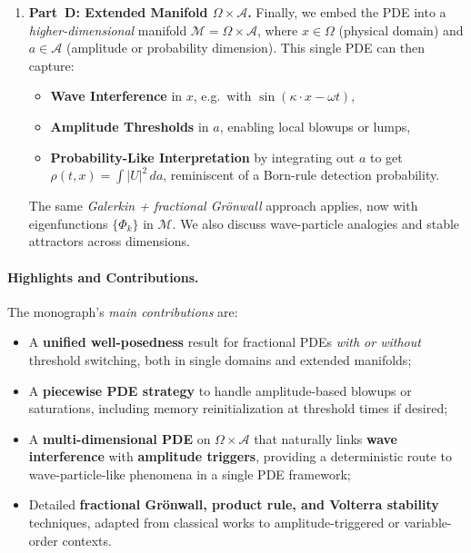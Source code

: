 \documentclass[12pt]{article}
\begin{document}
\begin{enumerate}
\item \textbf{Part~D: Extended Manifold \(\Omega\times \mathcal{A}\).}
  Finally, we embed the PDE into a \emph{higher-dimensional} manifold 
  $\mathcal{M}=\Omega\times\mathcal{A}$, where $x\in\Omega$ (physical domain) and 
  $a\in\mathcal{A}$ (amplitude or probability dimension). This single PDE can then 
  capture:
  \begin{itemize}
    \item \textbf{Wave Interference} in $x$, e.g.\ with $\sin(\kappa\cdot x-\omega t)$,
    \item \textbf{Amplitude Thresholds} in $a$, enabling local blowups or lumps,
    \item \textbf{Probability-Like Interpretation} by integrating out $a$ to get 
          $\rho(t,x)=\int|U|^2\,da$, reminiscent of a Born-rule detection probability.
  \end{itemize}
  The same \emph{Galerkin + fractional Grönwall} approach applies, now with 
  eigenfunctions $\{\Phi_k\}$ in $\mathcal{M}$. We also discuss wave-particle analogies 
  and stable attractors across dimensions.
\end{enumerate}

\paragraph{Highlights and Contributions.}
The monograph’s \emph{main contributions} are:
\begin{itemize}
    \item A \textbf{unified well-posedness} result for fractional PDEs \emph{with or 
          without} threshold switching, both in single domains and extended manifolds;
    \item A \textbf{piecewise PDE strategy} to handle amplitude-based blowups or saturations, 
          including memory reinitialization at threshold times if desired;
    \item A \textbf{multi-dimensional PDE} on $\Omega\times\mathcal{A}$ that naturally 
          links \textbf{wave interference} with \textbf{amplitude triggers}, providing a 
          deterministic route to wave-particle-like phenomena in a single PDE framework;
    \item Detailed \textbf{fractional Grönwall, product rule, and Volterra stability} 
          techniques, adapted from classical works \cite{Diethelm2010,Kilbas2006} to 
          amplitude-triggered or variable-order contexts.
\end{itemize}
\end{document}
